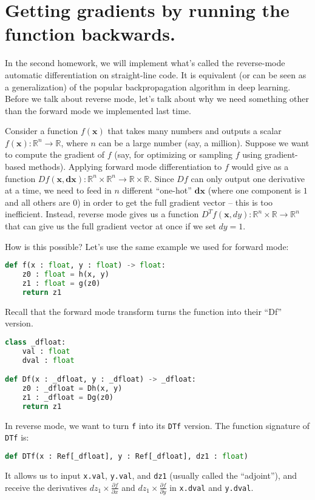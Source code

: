 




\section{Getting gradients by running the function backwards.}

In the second homework, we will implement what's called the reverse-mode automatic differentiation on straight-line code. It is equivalent (or can be seen as a generalization) of the popular backpropagation algorithm in deep learning. Before we talk about reverse mode, let's talk about why we need something other than the forward mode we implemented last time.

Consider a function $f(\mathbf{x})$ that takes many numbers and outputs a scalar $f(\mathbf{x}): \mathbb{R}^n \rightarrow \mathbb{R}$, where $n$ can be a large number (say, a million). Suppose we want to compute the gradient of $f$ (say, for optimizing or sampling $f$ using gradient-based methods). Applying forward mode differentiation to $f$ would give as a function $Df(\mathbf{x}, \mathbf{dx}) : \mathbb{R}^n \times \mathbb{R}^n \rightarrow \mathbb{R} \times \mathbb{R}$. Since $Df$ can only output one derivative at a time, we need to feed in $n$ different ``one-hot'' $\mathbf{dx}$ (where one component is $1$ and all others are $0$) in order to get the full gradient vector -- this is too inefficient. Instead, reverse mode gives us a function $D^{T}f(\mathbf{x}, dy) : \mathbb{R}^n \times \mathbb{R} \rightarrow \mathbb{R}^n$ that can give us the full gradient vector at once if we set $dy=1$.

How is this possible? Let's use the same example we used for forward mode:
\begin{lstlisting}[language=Python]
def f(x : float, y : float) -> float:
	z0 : float = h(x, y)
	z1 : float = g(z0)
	return z1
\end{lstlisting}
Recall that the forward mode transform turns the function into their ``Df'' version.
\begin{lstlisting}[language=Python]
class _dfloat:
	val : float
	dval : float

def Df(x : _dfloat, y : _dfloat) -> _dfloat:
	z0 : _dfloat = Dh(x, y)
	z1 : _dfloat = Dg(z0)
	return z1
\end{lstlisting}
In reverse mode, we want to turn \lstinline{f} into its \lstinline{DTf} version. The function signature of \lstinline{DTf} is:
\begin{lstlisting}[language=Python]
def DTf(x : Ref[_dfloat], y : Ref[_dfloat], dz1 : float)
\end{lstlisting}
It allows us to input \lstinline{x.val}, \lstinline{y.val}, and \lstinline{dz1} (usually called the ``adjoint''), and receive the derivatives $dz_1 \times \frac{\partial f}{\partial x}$ and $dz_1 \times \frac{\partial f}{\partial y}$ in \lstinline{x.dval} and \lstinline{y.dval}.

